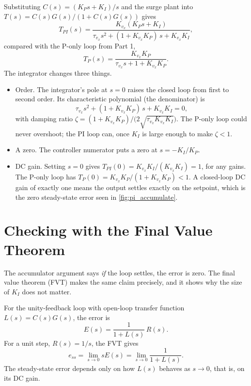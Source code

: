 \documentclass[12pt]{article}
\begin{document}
Substituting $C(s) = (K_P s + K_I)/s$ and the surge plant into $T(s) = C(s)G(s)/(1 + C(s)G(s))$ gives
\begin{equation}
  T_{PI}(s) = \frac{K_{v_x}(K_P s + K_I)}{\tau_{v_x} s^2 + (1 + K_{v_x}K_P)\, s + K_{v_x}K_I},
  \label{eq:cl_pi}
\end{equation}
compared with the P-only loop from Part 1,
\[
  T_{P}(s) = \frac{K_{v_x}K_P}{\tau_{v_x} s + 1 + K_{v_x}K_P}.
\]
The integrator changes three things.
\begin{itemize}
  \item Order.  The integrator's pole at $s=0$ raises the closed loop from first to second order.  Its characteristic polynomial (the denominator) is
  \begin{equation}
    \tau_{v_x} s^2 + (1 + K_{v_x}K_P)\, s + K_{v_x}K_I = 0,
    \label{eq:charpoly}
  \end{equation}
  with damping ratio $\zeta = (1 + K_{v_x}K_P)\big/\big(2\sqrt{\tau_{v_x}K_{v_x}K_I}\big)$.  The P-only loop could never overshoot; the PI loop can, once $K_I$ is large enough to make $\zeta < 1$.
  \item A zero.  The controller numerator puts a zero at $s = -K_I/K_P$.
  \item DC gain.  Setting $s = 0$ gives $T_{PI}(0) = K_{v_x}K_I/(K_{v_x}K_I) = 1$, for any gains.  The P-only loop has $T_P(0) = K_{v_x}K_P/(1 + K_{v_x}K_P) < 1$.  A closed-loop DC gain of exactly one means the output settles exactly on the setpoint, which is the zero steady-state error seen in \cref{fig:pi_accumulate}.
\end{itemize}

\section{Checking with the Final Value Theorem}
\label{sec:fvt}

The accumulator argument says \emph{if} the loop settles, the error is zero.  The final value theorem (FVT) makes the same claim precisely, and it shows why the size of $K_I$ does not matter.

For the unity-feedback loop with open-loop transfer function $L(s) = C(s)G(s)$, the error is
\[
  E(s) = \frac{1}{1 + L(s)}\, R(s).
\]
For a unit step, $R(s) = 1/s$, the FVT gives
\begin{equation}
  e_{ss} = \lim_{s\to 0} s E(s) = \lim_{s\to 0} \frac{1}{1 + L(s)}.
  \label{eq:fvt}
\end{equation}
The steady-state error depends only on how $L(s)$ behaves as $s \to 0$, that is, on its DC gain.
\end{document}
